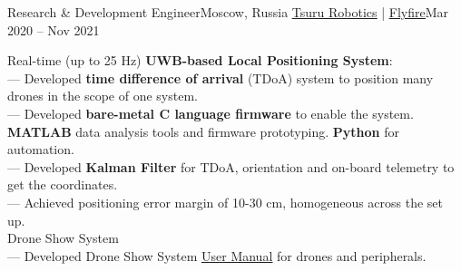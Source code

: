 \resumeSubheading
  {Research \& Development Engineer}{Moscow, Russia}
  {\href{https://tsuru.su/en/}{\underline{Tsuru Robotics}} | \href{http://flyfire.io/}{\underline{Flyfire}}}{Mar 2020 -- Nov 2021}
  \begin{itemize}[leftmargin=0in, label={}]
    \small{\item{
      {Real-time (up to 25 Hz) \textbf{UWB-based Local Positioning System}:}\\
      {— Developed \textbf{time difference of arrival} (TDoA) system to position many drones in the scope of one system.}\\
      {— Developed \textbf{bare-metal C language firmware} to enable the system. \textbf{MATLAB} data analysis tools and firmware prototyping. \textbf{Python} for automation.}\\
      {— Developed \textbf{Kalman Filter} for TDoA, orientation and on-board telemetry to get the coordinates.}\\      
      {— Achieved positioning error margin of 10-30 cm, homogeneous across the set up.}\\
      {Drone Show System}\\
      {— Developed Drone Show System \href{https://bit.ly/3fa2qcd}{\underline{User Manual}} for drones and peripherals.}
    }}
  \end{itemize}